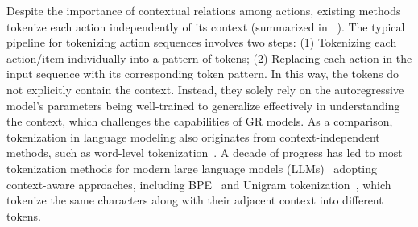 Despite the importance of contextual relations among actions, existing methods tokenize each action independently of its context (summarized in ~).
The typical pipeline for tokenizing action sequences involves two steps: (1) Tokenizing each action/item individually into a pattern of tokens; (2) Replacing each action in the input sequence with its corresponding token pattern.
In this way, the tokens do not explicitly contain the context. Instead, they solely rely on the autoregressive model's parameters being well-trained to generalize effectively in understanding the context,
which challenges the capabilities of GR models.
As a comparison, tokenization in language modeling also originates from context-independent methods, such as word-level tokenization~\cite{sutskever2014seq2seq,bahdanau2015word}. A decade of progress has led to most tokenization methods for modern large language models (LLMs)~\cite{openai2022chatgpt,google2023gemini,touvron2023llama,zhao2023survey} adopting context-aware approaches, including BPE~\cite{sennrich2016bpe} and Unigram tokenization~\cite{kudo2018unigram}, which tokenize the same characters along with their adjacent context into different tokens.

